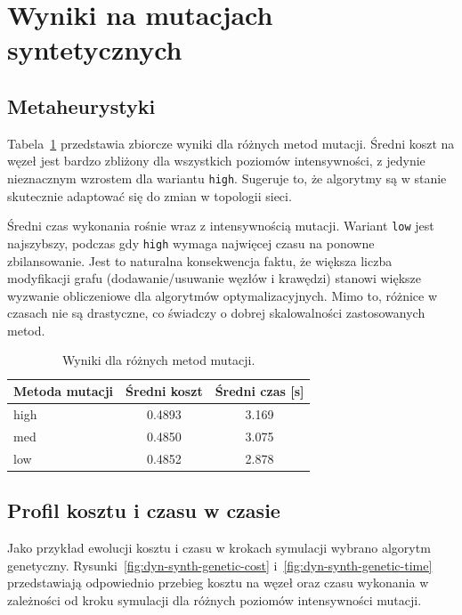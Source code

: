 \section{Wyniki na mutacjach syntetycznych}
\subsection{Metaheurystyki}

Tabela~\ref{tab:dyn-synth-warm} przedstawia zbiorcze wyniki dla różnych metod mutacji. Średni koszt na węzeł jest bardzo zbliżony dla wszystkich poziomów intensywności, z jedynie nieznacznym wzrostem dla wariantu \texttt{high}. Sugeruje to, że algorytmy są w stanie skutecznie adaptować się do zmian w topologii sieci.

Średni czas wykonania rośnie wraz z intensywnością mutacji. Wariant \texttt{low} jest najszybszy, podczas gdy \texttt{high} wymaga najwięcej czasu na ponowne zbilansowanie. Jest to naturalna konsekwencja faktu, że większa liczba modyfikacji grafu (dodawanie/usuwanie węzłów i krawędzi) stanowi większe wyzwanie obliczeniowe dla algorytmów optymalizacyjnych. Mimo to, różnice w czasach nie są drastyczne, co świadczy o dobrej skalowalności zastosowanych metod.

\begin{table}[H]
  \centering
  \caption{Wyniki dla różnych metod mutacji.}
  \label{tab:dyn-synth-warm}
  \begin{tabular}{lcc}
    \toprule
    \textbf{Metoda mutacji} & \textbf{Średni koszt} & \textbf{Średni czas [s]} \\
    \midrule
    high                    & 0.4893                & 3.169                    \\
    med                     & 0.4850                & 3.075                    \\
    low                     & 0.4852                & 2.878                    \\
    \bottomrule
  \end{tabular}
\end{table}

\subsection{Profil kosztu i czasu w czasie}
Jako przykład ewolucji kosztu i czasu w krokach symulacji wybrano algorytm genetyczny. Rysunki~\ref{fig:dyn-synth-genetic-cost} i~\ref{fig:dyn-synth-genetic-time} przedstawiają odpowiednio przebieg kosztu na węzeł oraz czasu wykonania w zależności od kroku symulacji dla różnych poziomów intensywności mutacji.

